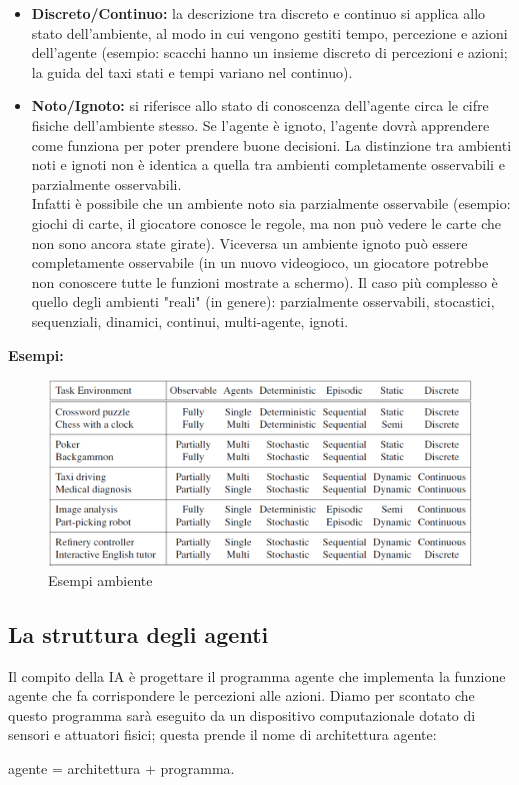 \documentclass{article}
\begin{document}
\begin{itemize}
    \item \textbf{Discreto/Continuo: }la descrizione tra discreto e continuo si applica allo stato dell'ambiente, al modo in cui vengono gestiti tempo, percezione e azioni dell'agente (esempio: scacchi hanno un insieme discreto di percezioni e azioni; la guida del taxi stati e tempi variano nel continuo).
    \item \textbf{Noto/Ignoto: }si riferisce allo stato di conoscenza dell'agente circa le cifre fisiche dell'ambiente stesso. Se l'agente è ignoto, l'agente dovrà apprendere come funziona per poter prendere buone decisioni. La distinzione tra ambienti noti e ignoti non è identica a quella tra ambienti completamente osservabili e parzialmente osservabili.\\
    Infatti è possibile che un ambiente noto sia parzialmente osservabile (esempio: giochi di carte, il giocatore conosce le regole, ma non può vedere le carte che non sono ancora state girate). Viceversa un ambiente ignoto può essere completamente osservabile (in un nuovo videogioco, un giocatore potrebbe non conoscere tutte le funzioni mostrate a schermo). Il caso più complesso è quello degli ambienti "reali" (in genere): parzialmente osservabili, stocastici, sequenziali, dinamici, continui, multi-agente, ignoti.
\end{itemize}
\textbf{Esempi:}
\begin{figure}[H]
    \centering
    \includegraphics[width=0.5\linewidth]{Images/EsempiAmbiente.png}
    \caption{Esempi ambiente}
    \label{fig:enter-label}
\end{figure}
\newpage
\subsection{La struttura degli agenti}
\noindent Il compito della IA è progettare il programma agente che implementa la funzione agente che fa corrispondere le percezioni alle azioni. Diamo per scontato che questo programma sarà eseguito da un dispositivo computazionale dotato di sensori e attuatori fisici; questa prende il nome di architettura agente:\newline
\begin{center}
     agente = architettura + programma.
\end{center}
\end{document}
